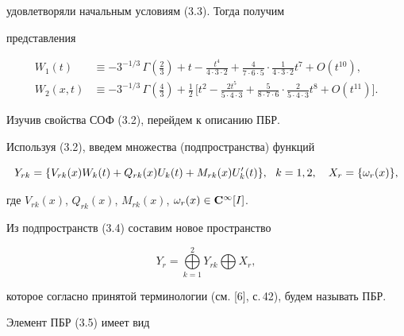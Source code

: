 удовлетворяли начальным условиям (3.3). Тогда получим


представления


\begin{align*}


W_1 (t) & \equiv -3^{{-1}/{3}}\, \Gamma \left(\frac{2}{3} \right) + t -


\frac{t^4}{4 \cdot 3 \cdot 2} + \frac{4}{7\cdot 6 \cdot 5 }


\cdot \frac{1}{4 \cdot 3 \cdot 2 } t^7 + O (t^{10}), \\


%


W_2 (x,t) & \equiv -3^{{-1}/{3}}\, \Gamma \left(\frac{4}{3}\right)


+ \frac{1}{2}\, \biggl[ t^2 - \frac{2t^5}{5 \cdot 4 \cdot 3}


+\frac{5}{8\cdot 7 \cdot 6 } \cdot \frac{2}{5 \cdot 4 \cdot 3 } t


^8 +O (t^{11}) \biggr].


\end{align*}





Изучив свойства СОФ (3.2), перейдем к описанию ПБР.





Используя (3.2), введем множества (подпространства) функций


\begin{equation}


Y_{rk} = \{ V_{rk} (x) W_k (t) + Q_{rk} (x) U_k (t) + M_{rk} (x) U'_k (t) \},


\ \  k=1, 2, \quad X_r = \{ \o_r (x) \}, 


\end{equation}


где $V_{rk} (x)$, $Q_{rk} (x)$, $M_{rk} (x)$, $\o_{r} (x) \in


\bold{C}^{\infty} [I]$.


Из подпространств (3.4) составим новое пространство


\begin{equation}


Y_r = \bigoplus \limits_{k=1}^2 Y_{rk} \bigoplus X_r, 


\end{equation}


которое согласно принятой терминологии (см. [6], с.\,42), будем называть ПБР.


Элемент ПБР (3.5) имеет вид


